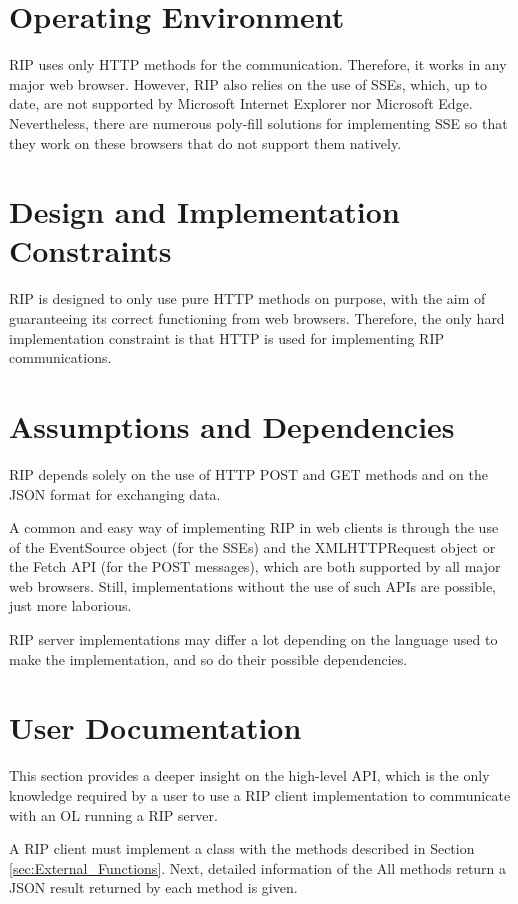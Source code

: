 \section{Operating Environment}
RIP uses only HTTP methods for the communication. Therefore, it works in any major web browser. However, RIP also relies on the use of SSEs, which, up to date, are not supported by Microsoft Internet Explorer nor Microsoft Edge. Nevertheless, there are numerous poly-fill solutions for implementing SSE so that they work on these browsers that do not support them natively.

\section{Design and Implementation Constraints}
RIP is designed to only use pure HTTP methods on purpose, with the aim of guaranteeing its correct functioning from web browsers. Therefore, the only hard implementation constraint is that HTTP is used for implementing RIP communications.

\section{Assumptions and Dependencies}
RIP depends solely on the use of HTTP POST and GET methods and on the JSON format for exchanging data. 

A common and easy way of implementing RIP in web clients is through the use of the EventSource object \cite{eventsource} (for the SSEs) and the XMLHTTPRequest object \cite{xhr} or the Fetch API \cite{fetch} (for the POST messages), which are both supported by all major web browsers. Still, implementations without the use of such APIs are possible, just more laborious. 

RIP server implementations may differ a lot depending on the language used to make the implementation, and so do their possible dependencies.

\section{User Documentation}
This section provides a deeper insight on the high-level API, which is the only knowledge required by a user to use a RIP client implementation to communicate with an OL running a RIP server.

A RIP client must implement a class with the methods described in Section \ref{sec:External_Functions}. Next, detailed information of the All methods return a JSON result returned by each method is given.

